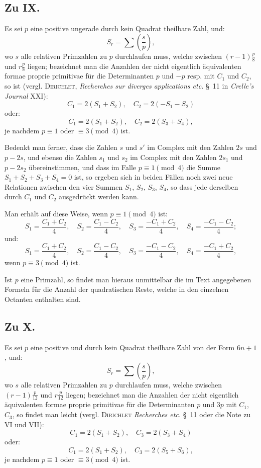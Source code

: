 \documentclass[12pt,a4paper]{article}
\begin{document}
\subsection*{Zu IX.}

Es sei $p$ eine positive ungerade durch kein Quadrat theilbare Zahl, und:
\[
S_r = \sum \left(\frac{s}{p}\right),
\]
wo $s$ alle relativen Primzahlen zu $p$ durchlaufen muss, welche zwischen $(r - 1)\frac{p}{8}$ und $r\frac{p}{8}$
liegen; bezeichnet man die Anzahlen der nicht eigentlich äquivalenten formae proprie primitivae für die
Determinanten $p$ und $-p$ resp. mit $C_1$ und $C_2$, so ist (vergl. \textsc{Dirichlet}, \textit{Recherches sur diverges
applications etc.} \S~11 in \textit{Crelle's Journal} XXI):
\[
C_1 = 2(S_1 + S_2), \quad C_2 = 2(-S_1 - S_2)
\]
oder:
\[
C_1 = 2(S_1 + S_2), \quad C_2 = 2(S_3 + S_4),
\]
je nachdem $p \equiv 1$ oder $\equiv 3 \pmod{4}$ ist.

Bedenkt man ferner, dass die Zahlen $s$ und $s'$ im Complex mit den Zahlen $2s$ und $p - 2s$,
und ebenso die Zahlen $s_1$ und $s_2$ im Complex mit den Zahlen $2s_1$ und $p - 2s_2$ übereinstimmen,
und dass im Falle $p \equiv 1 \pmod{4}$ die Summe $S_1 + S_2 + S_3 + S_4 = 0$ ist, so ergeben sich in
beiden Fällen noch zwei neue Relationen zwischen den vier Summen $S_1$, $S_2$, $S_3$, $S_4$,
so dass jede derselben durch $C_1$ und $C_2$ ausgedrückt werden kann.

Man erhält auf diese Weise, wenn $p \equiv 1 \pmod{4}$ ist:
\[
S_1 = \frac{C_1 + C_2}{4}, \quad S_2 = \frac{C_1 - C_2}{4}, \quad S_3 = \frac{-C_1 + C_2}{4}, \quad S_4 = \frac{-C_1 - C_2}{4};
\]
und:
\[
S_1 = \frac{C_1 + C_2}{4}, \quad S_2 = \frac{C_1 - C_2}{4}, \quad S_3 = \frac{-C_1 - C_2}{4}, \quad S_4 = \frac{-C_1 + C_2}{4},
\]
 wenn $p \equiv 3 \pmod{4}$ ist.

Ist $p$ eine Primzahl, so findet man hieraus unmittelbar die im Text angegebenen Formeln für die
Anzahl der quadratischen Reste, welche in den einzelnen Octanten enthalten sind.


\subsection*{Zu X.}

Es sei $p$ eine positive und durch kein Quadrat theilbare Zahl von der Form $6n + 1$, und:
\[
S_r = \sum \left(\frac{s}{p}\right),
\]
wo $s$ alle relativen Primzahlen zu $p$ durchlaufen muss, welche zwischen $(r - 1)\frac{p}{12}$ und $r\frac{p}{12}$
liegen; bezeichnet man die Anzahlen der nicht eigentlich äquivalenten formae proprie primitivae für die
Determinanten $p$ und $3p$ mit $C_1$, $C_3$, so findet man leicht (vergl. \textsc{Dirichlet} \textit{Recherches etc.}
\S~11 oder die Note zu VI und VII):
\[
C_1 = 2(S_1 + S_2), \quad C_3 = 2(S_3 + S_4)
\]
oder:
\[
C_1 = 2(S_1 + S_2), \quad C_3 = 2(S_5 + S_6),
\]
je nachdem $p \equiv 1$ oder $\equiv 3 \pmod{4}$ ist.
\end{document}
